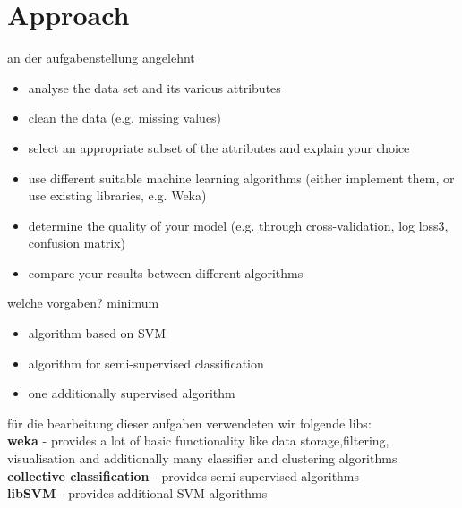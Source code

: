 \section{Approach}
\label{approach}


an der aufgabenstellung angelehnt

\begin{itemize}
	\item[\textbullet] analyse the data set and its various attributes
	\item[\textbullet] clean the data (e.g. missing values)
	\item[\textbullet] select an appropriate subset of the attributes and explain your choice
	\item[\textbullet] use different suitable machine learning algorithms (either implement them, or use existing libraries, e.g. Weka)
	\item[\textbullet] determine the quality of your model (e.g. through cross-validation, log loss3, confusion matrix)
	\item[\textbullet] compare your results between different algorithms
\end{itemize}


welche vorgaben?
minimum
\begin{itemize}
	\item[\textbullet] algorithm based on SVM
	\item[\textbullet] algorithm for semi-supervised classification
	\item[\textbullet] one additionally supervised algorithm
\end{itemize}




für die bearbeitung dieser aufgaben verwendeten wir folgende libs: \\
\textbf{weka} - provides a lot of basic functionality like data storage,filtering, visualisation and additionally many classifier and clustering algorithms \\
\textbf{collective classification} - provides semi-supervised algorithms \\
\textbf{libSVM} - provides additional SVM algorithms \\

